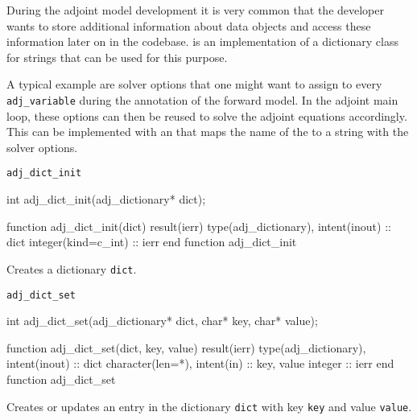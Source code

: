 
During the adjoint model development it is very common that the developer wants to store additional information about \libadjoint data objects 
and access these information later on in the codebase.
 is an implementation of a dictionary class for strings that can be used for this purpose.

A typical example are solver options that one might want to assign to every \texttt{adj_variable} during the annotation of the forward model.
In the adjoint main loop, these options can then be reused to solve the adjoint equations accordingly.
This can be implemented with an  that maps the name of the  to a string with the solver options.

\begin{boxwithtitle}{\texttt{adj_dict_init}}
\begin{minipage}{\columnwidth}
\begin{ccode}
  int adj_dict_init(adj_dictionary* dict);
\end{ccode}
\begin{fortrancode}
  function adj_dict_init(dict) result(ierr)
    type(adj_dictionary), intent(inout) :: dict
    integer(kind=c_int) :: ierr
  end function adj_dict_init
\end{fortrancode}
\end{minipage}
\end{boxwithtitle}

Creates a dictionary \texttt{dict}.


\begin{boxwithtitle}{\texttt{adj_dict_set}}
\begin{minipage}{\columnwidth}
\begin{ccode}
  int adj_dict_set(adj_dictionary* dict, char* key, char* value);
\end{ccode}
\begin{fortrancode}
  function adj_dict_set(dict, key, value) result(ierr)
    type(adj_dictionary), intent(inout) :: dict
    character(len=*), intent(in) :: key, value
    integer :: ierr
  end function adj_dict_set
\end{fortrancode}
\end{minipage}
\end{boxwithtitle}

Creates or updates an entry in the dictionary \texttt{dict} with key \texttt{key} and value \texttt{value}.


